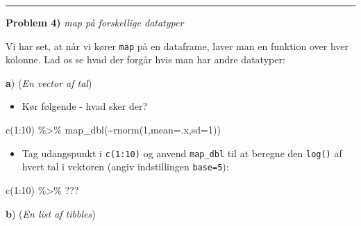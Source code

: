 \documentclass[
]{book}
\newenvironment{Shaded}{\begin{snugshade}}{\end{snugshade}}
\newcommand{\AttributeTok}[1]{\textcolor[rgb]{0.77,0.63,0.00}{#1}}
\newcommand{\DecValTok}[1]{\textcolor[rgb]{0.00,0.00,0.81}{#1}}
\newcommand{\FunctionTok}[1]{\textcolor[rgb]{0.00,0.00,0.00}{#1}}
\newcommand{\NormalTok}[1]{#1}
\newcommand{\SpecialCharTok}[1]{\textcolor[rgb]{0.00,0.00,0.00}{#1}}
\providecommand{\tightlist}{%
  \setlength{\itemsep}{0pt}\setlength{\parskip}{0pt}}
\begin{document}
\begin{center}\rule{0.5\linewidth}{0.5pt}\end{center}

\textbf{Problem 4)} \emph{map på forskellige datatyper}

Vi har set, at når vi kører \texttt{map} på en dataframe, laver man en funktion over hver kolonne. Lad os se hvad der forgår hvis man har andre datatyper:

\textbf{a}) (\emph{En vector af tal})

\begin{itemize}
\tightlist
\item
  Kør følgende - hvad sker der?
\end{itemize}

\begin{Shaded}
\begin{Highlighting}[]
\FunctionTok{c}\NormalTok{(}\DecValTok{1}\SpecialCharTok{:}\DecValTok{10}\NormalTok{) }\SpecialCharTok{\%\textgreater{}\%} \FunctionTok{map\_dbl}\NormalTok{(}\SpecialCharTok{\textasciitilde{}}\FunctionTok{rnorm}\NormalTok{(}\DecValTok{1}\NormalTok{,}\AttributeTok{mean=}\NormalTok{.x,}\AttributeTok{sd=}\DecValTok{1}\NormalTok{))}
\end{Highlighting}
\end{Shaded}

\begin{itemize}
\tightlist
\item
  Tag udangspunkt i \texttt{c(1:10)} og anvend \texttt{map\_dbl} til at beregne den \texttt{log()} af hvert tal i vektoren (angiv indstillingen \texttt{base=5}):
\end{itemize}

\begin{Shaded}
\begin{Highlighting}[]
\FunctionTok{c}\NormalTok{(}\DecValTok{1}\SpecialCharTok{:}\DecValTok{10}\NormalTok{) }\SpecialCharTok{\%\textgreater{}\%}\NormalTok{ ???}
\end{Highlighting}
\end{Shaded}

\textbf{b}) (\emph{En list af tibbles})
\end{document}
